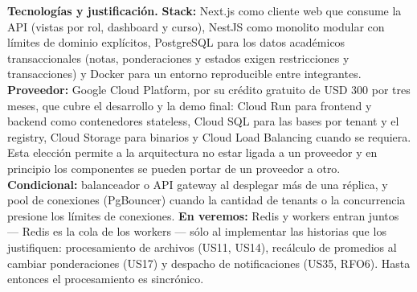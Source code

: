 \documentclass[letterpaper,10pt]{article}
\newcommand{\st}[1]{\textcolor{amber}{\textbf{#1}}}
\begin{document}
\textbf{Tecnologías y justificación.} \st{Stack:} Next.js como cliente web que consume la API (vistas por rol, dashboard y curso), NestJS como monolito modular con límites de dominio explícitos, PostgreSQL para los datos académicos transaccionales (notas, ponderaciones y estados exigen restricciones y transacciones) y Docker para un entorno reproducible entre integrantes. \st{Proveedor:} Google Cloud Platform, por su crédito gratuito de USD 300 por tres meses, que cubre el desarrollo y la demo final: Cloud Run para frontend y backend como contenedores stateless, Cloud SQL para las bases por tenant y el registry, Cloud Storage para binarios y Cloud Load Balancing cuando se requiera. Esta elección permite a la arquitectura no estar ligada a un proveedor y en principio los componentes se pueden portar de un proveedor a otro. \st{Condicional:} balanceador o API gateway al desplegar más de una réplica, y pool de conexiones (PgBouncer) cuando la cantidad de tenants o la concurrencia presione los límites de conexiones. \st{En veremos:} Redis y workers entran juntos --- Redis es la cola de los workers --- sólo al implementar las historias que los justifiquen: procesamiento de archivos (US11, US14), recálculo de promedios al cambiar ponderaciones (US17) y despacho de notificaciones (US35, RFO6). Hasta entonces el procesamiento es sincrónico.
\end{document}
